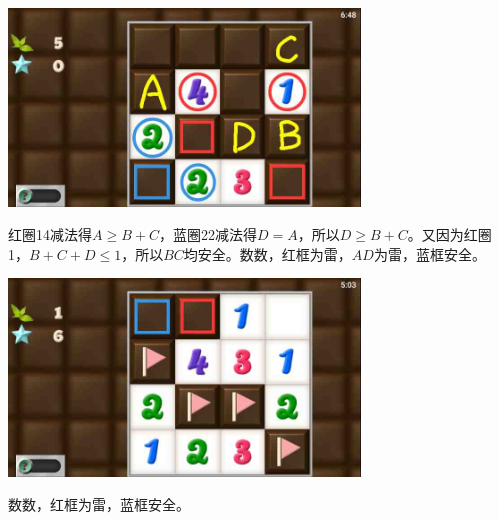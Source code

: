 \subsection{} %
\begin{center}
    \includegraphics[width=0.7\textwidth]{puzzlelow/76-1.jpg}
\end{center}
红圈14减法得$A\ge B+C$，蓝圈22减法得$D=A$，所以$D\ge B+C$。又因为红圈1，$B+C+D\le 1$，所以$BC$均安全。数数，红框为雷，$AD$为雷，蓝框安全。
\begin{center}
    \includegraphics[width=0.7\textwidth]{puzzlelow/76-2.jpg}
\end{center}
数数，红框为雷，蓝框安全。


